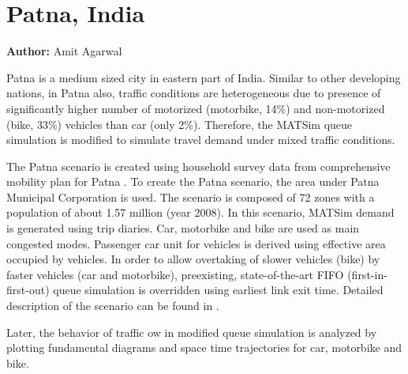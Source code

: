 \section{Patna, India}
\label{ch:scenarios:patna}
\hfill \textbf{Author:} Amit Agarwal

Patna is a medium sized city in eastern part of India. Similar to other developing nations, in Patna also, traffic conditions are heterogeneous due to presence of significantly higher number of motorized (motorbike, 14\%) and non-motorized (bike, 33\%) vehicles than car (only 2\%). Therefore, the MATSim queue simulation is modified to simulate travel demand under mixed traffic conditions.

The Patna scenario is created using household survey data from comprehensive mobility plan for Patna \citep[][]{TrippItransVks2009PatnaReport}. To create the Patna scenario, the area under Patna Municipal Corporation is used. The scenario is composed of 72 zones with a population of about 1.57 million (year 2008). In this scenario, MATSim demand is generated using trip diaries. Car, motorbike and bike are used as main congested modes. Passenger car unit for vehicles is derived using effective area occupied by vehicles. In order to allow overtaking of slower vehicles (bike) by faster vehicles (car and motorbike), preexisting, state-of-the-art FIFO (first-in-first-out) queue simulation is overridden using earliest link exit time. Detailed description of the scenario can be found in \citet[][]{AgarwalEtcMixedTraffic}.

Later, the behavior of traffic ow in modified queue simulation is analyzed by plotting fundamental diagrams and space time trajectories for car, motorbike and bike.

